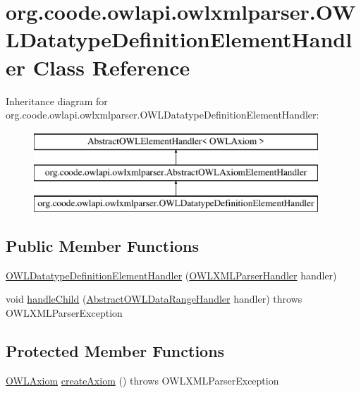 \hypertarget{classorg_1_1coode_1_1owlapi_1_1owlxmlparser_1_1_o_w_l_datatype_definition_element_handler}{\section{org.\-coode.\-owlapi.\-owlxmlparser.\-O\-W\-L\-Datatype\-Definition\-Element\-Handler Class Reference}
\label{classorg_1_1coode_1_1owlapi_1_1owlxmlparser_1_1_o_w_l_datatype_definition_element_handler}
}
Inheritance diagram for org.\-coode.\-owlapi.\-owlxmlparser.\-O\-W\-L\-Datatype\-Definition\-Element\-Handler\-:\begin{figure}[H]
\begin{center}
\leavevmode
\includegraphics[height=3.000000cm]{classorg_1_1coode_1_1owlapi_1_1owlxmlparser_1_1_o_w_l_datatype_definition_element_handler}
\end{center}
\end{figure}
\subsection*{Public Member Functions}
\begin{DoxyCompactItemize}
\item 
\hyperlink{classorg_1_1coode_1_1owlapi_1_1owlxmlparser_1_1_o_w_l_datatype_definition_element_handler_a7662e4f9e6a0be2e7be061bf86d04494}{O\-W\-L\-Datatype\-Definition\-Element\-Handler} (\hyperlink{classorg_1_1coode_1_1owlapi_1_1owlxmlparser_1_1_o_w_l_x_m_l_parser_handler}{O\-W\-L\-X\-M\-L\-Parser\-Handler} handler)
\item 
void \hyperlink{classorg_1_1coode_1_1owlapi_1_1owlxmlparser_1_1_o_w_l_datatype_definition_element_handler_ac34d5aa2997433eb84a551708db864e3}{handle\-Child} (\hyperlink{classorg_1_1coode_1_1owlapi_1_1owlxmlparser_1_1_abstract_o_w_l_data_range_handler}{Abstract\-O\-W\-L\-Data\-Range\-Handler} handler)  throws O\-W\-L\-X\-M\-L\-Parser\-Exception 
\end{DoxyCompactItemize}
\subsection*{Protected Member Functions}
\begin{DoxyCompactItemize}
\item 
\hyperlink{interfaceorg_1_1semanticweb_1_1owlapi_1_1model_1_1_o_w_l_axiom}{O\-W\-L\-Axiom} \hyperlink{classorg_1_1coode_1_1owlapi_1_1owlxmlparser_1_1_o_w_l_datatype_definition_element_handler_a3f839cf33e7c448f0bff633855df8f59}{create\-Axiom} ()  throws O\-W\-L\-X\-M\-L\-Parser\-Exception 
\end{DoxyCompactItemize}
